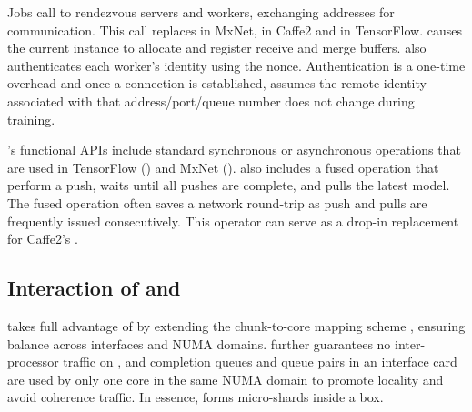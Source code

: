 Jobs call  to rendezvous servers and workers, exchanging addresses for communication. This call replaces  in MxNet,  in Caffe2 and  in TensorFlow.  causes the current \phub instance to allocate and register receive and merge buffers. \phub also authenticates each worker's identity using the nonce. Authentication is a one-time overhead and once a connection is established, \phub assumes the remote identity associated with that address/port/queue number does not change during training.

\phub{}'s functional APIs include standard synchronous or asynchronous  operations that are used in TensorFlow () and MxNet (). \phub also includes a fused  operation that perform a push, waits until all pushes are complete, and pulls the latest model. The fused operation often saves a network round-trip as push and pulls are frequently issued consecutively. This operator can serve as a drop-in replacement for Caffe2's .


\subsection{Interaction of \pbox and \phub}
\phub takes full advantage of \pbox by extending the chunk-to-core mapping scheme%
, ensuring balance across interfaces and NUMA domains. \phub further guarantees no inter-processor traffic on \pbox, and completion queues and queue pairs in an interface card are used by only one core in the same NUMA domain to promote locality and avoid coherence traffic. In essence, \pbox forms micro-shards inside a box.


